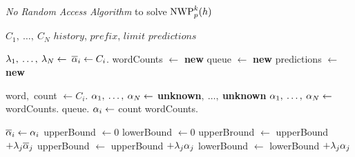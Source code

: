 \begin{algorithm}
  \caption{\emph{No Random Access Algorithm} to solve $\NWP[p][k]{h}$}
  \label{alg:norandomaccessalgorithm}
  \begin{algorithmic}[1]
    \Require $C_1, \: \ldots, \: C_N$
    \Require $history$, $prefix$, $limit$
    \Statex {}
    \Ensure $predictions$

    \State $\lambda_1, \: \ldots, \: \lambda_N \gets$ 
      \label{ln:nra-sumweights}
      \label{ln:nra-bara-for}
      \State $\overline{\alpha}_i \gets C_i$.
        \label{ln:nra-bara-peek}
    \EndFor
    \State wordCounts $\gets$ \textbf{new} 
      \label{ln:nra-wordcounts}
    \State queue $\gets$ \textbf{new} 
      \label{ln:nra-queue}
    \State predictions $\gets$ \textbf{new} 
      \label{ln:nra-predictions}

    \vspace{0.7em}
      \label{ln:nra-while}
      \State word$,$ count $\gets C_i$.
        \label{ln:nra-next}
        \label{ln:nra-contains}
        \State $\alpha_1, \: \ldots, \: \alpha_N \gets $ \textbf{unknown}$, \: \ldots, \:$\textbf{unknown}
          \label{ln:nra-set-unkown}
      \Else
        \State $\alpha_1, \: \ldots, \: \alpha_N \gets $ wordCounts.
          \label{ln:nra-get-wordcounts}
        \State queue.
          \label{ln:nra-queue-remove}
      \EndIf
      \State $\alpha_i \gets$ count
        \label{ln:nra-a-set}
      \State wordCounts.
        \label{ln:nra-update-mapping}

      \vspace{0.7em}
      \State $\overline{\alpha}_i \gets \alpha_i$
        \label{ln:nra-bara-update}
      \State upperBound $\gets 0$
        \label{ln:nra-upperbound-init}
      \State lowerBound $\gets 0$
        \label{ln:nra-lowerbound-init}
          \State upperBround $\gets$ upperBound $+ \lambda_j \overline{\alpha}_j$
            \label{ln:nra-upperbound-unknown}
        \Else
          \State upperBound $\gets$ upperBound $+ \lambda_j \alpha_j$
            \label{ln:nra-upperbound-known}
          \State lowerBound $\gets$ lowerBound $+ \lambda_j \alpha_j$
            \label{ln:nra-lowerbound-known}
        \EndIf
      \EndFor


\end{algorithmic}
\end{algorithm}
